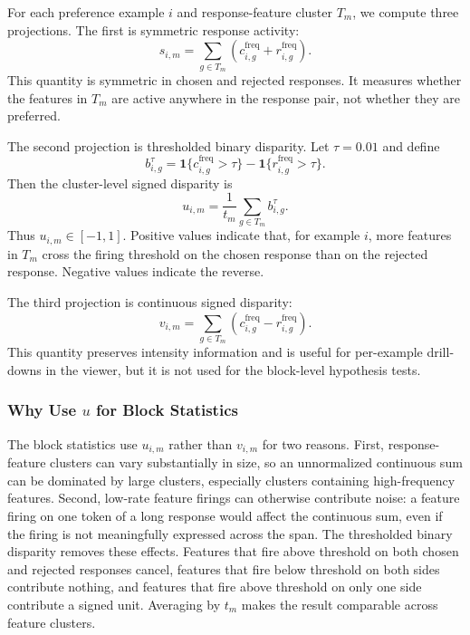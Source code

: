 \documentclass{article} %
\begin{document}
For each preference example $i$ and response-feature cluster $T_m$, we compute three projections. The first is symmetric response activity:
\begin{equation}
s_{i,m} = \sum_{g\in T_m}\left(c^{\text{freq}}_{i,g} + r^{\text{freq}}_{i,g}\right).
\end{equation}
This quantity is symmetric in chosen and rejected responses. It measures whether the features in $T_m$ are active anywhere in the response pair, not whether they are preferred.

The second projection is thresholded binary disparity. Let $\tau=0.01$ and define
\begin{equation}
b^\tau_{i,g} = \mathbf{1}\{c^{\text{freq}}_{i,g}>\tau\} - \mathbf{1}\{r^{\text{freq}}_{i,g}>\tau\}.
\end{equation}
Then the cluster-level signed disparity is
\begin{equation}
u_{i,m} = \frac{1}{t_m}\sum_{g\in T_m} b^\tau_{i,g}.
\end{equation}
Thus $u_{i,m}\in[-1,1]$. Positive values indicate that, for example $i$, more features in $T_m$ cross the firing threshold on the chosen response than on the rejected response. Negative values indicate the reverse.

The third projection is continuous signed disparity:
\begin{equation}
v_{i,m} = \sum_{g\in T_m}\left(c^{\text{freq}}_{i,g} - r^{\text{freq}}_{i,g}\right).
\end{equation}
This quantity preserves intensity information and is useful for per-example drill-downs in the viewer, but it is not used for the block-level hypothesis tests.

\subsubsection{Why Use $u$ for Block Statistics}
\label{app:ftd-why-u}

The block statistics use $u_{i,m}$ rather than $v_{i,m}$ for two reasons. First, response-feature clusters can vary substantially in size, so an unnormalized continuous sum can be dominated by large clusters, especially clusters containing high-frequency features. Second, low-rate feature firings can otherwise contribute noise: a feature firing on one token of a long response would affect the continuous sum, even if the firing is not meaningfully expressed across the span. The thresholded binary disparity removes these effects. Features that fire above threshold on both chosen and rejected responses cancel, features that fire below threshold on both sides contribute nothing, and features that fire above threshold on only one side contribute a signed unit. Averaging by $t_m$ makes the result comparable across feature clusters.
\end{document}
